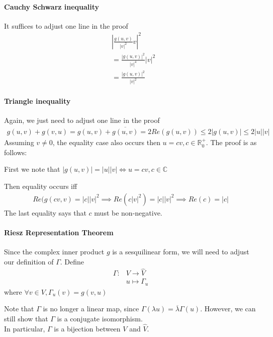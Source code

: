 \documentclass{article}
\begin{document}
\paragraph{Cauchy Schwarz inequality} It suffices to adjust one line in the proof
\begin{align*}
	&\left\lvert \frac{g(u,v)}{|v|^2}v \right\rvert^2\\
	&= \frac{|g(u,v)|^2}{|v|^4} |v|^2\\
	&= \frac{|g(u,v)|^2}{|v|^2}
\end{align*}

\paragraph{Triangle inequality} Again, we just need to adjust one line in the proof
\begin{align*}
	g(u,v) + g(v,u) = g(u,v) + \overline{g(u,v)} = 2Re(g(u,v))\leq 2|g(u,v)|\leq 2|u||v|
\end{align*}
Assuming $v\neq 0$, the equality case also occurs then $u=cv, c\in \mathbb{R}^+_0$. The proof is as follows:

First we note that $|g(u,v)|=|u||v|\iff u = cv, c\in \mathbb{C}$

Then equality occurs iff 
\begin{align*}
	Re(g(cv,v) = |c||v|^2\implies Re(c|v|^2)=|c||v|^2\implies Re(c)=|c|
\end{align*}
The last equality says that $c$ must be non-negative.

\paragraph{Riesz Representation Theorem}
Since the complex inner product $g$ is a sesquilinear form, we will need to adjust our definition of $\Gamma$.
Define 
\begin{align*}
	\Gamma: &V\rightarrow \hat{V}\\
	&u\mapsto \Gamma_u
\end{align*}
where $\forall v\in V, \Gamma_u(v) = g(v, u)$

Note that $\Gamma$ is no longer a linear map, since $\Gamma(\lambda u) = \overline{\lambda}\Gamma(u)$.
However, we can still show that $\Gamma$ is a conjugate isomorphism.\\
In particular, $\Gamma$ is a bijection between $V$ and $\hat{V}$.
\end{document}
